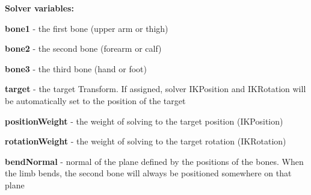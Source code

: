 {\bfseries Solver variables\+:}
\begin{DoxyItemize}
\item {\bfseries bone1} -\/ the first bone (upper arm or thigh)
\item {\bfseries bone2} -\/ the second bone (forearm or calf)
\item {\bfseries bone3} -\/ the third bone (hand or foot)
\item {\bfseries target} -\/ the target Transform. If assigned, solver I\+K\+Position and I\+K\+Rotation will be automatically set to the position of the target
\item {\bfseries position\+Weight} -\/ the weight of solving to the target position (I\+K\+Position)
\item {\bfseries rotation\+Weight} -\/ the weight of solving to the target rotation (I\+K\+Rotation)
\item {\bfseries bend\+Normal} -\/ normal of the plane defined by the positions of the bones. When the limb bends, the second bone will always be positioned somewhere on that plane
\end{DoxyItemize}

 